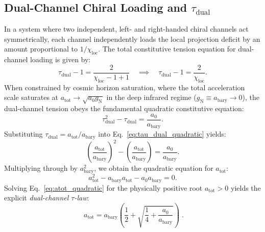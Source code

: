 \documentclass[11pt,a4paper]{article}
\theoremstyle{definition}
\begin{document}
\subsection{Dual-Channel Chiral Loading and $\tau_{\text{dual}}$}
In a system where two independent, left- and right-handed chiral channels act symmetrically, each channel independently loads the local projection deficit by an amount proportional to $1/\chi_{\text{loc}}$. The total constitutive tension equation for dual-channel loading is given by:
\begin{equation}
\tau_{\text{dual}} - 1 = \frac{2}{\chi_{\text{loc}} - 1 + 1} \quad \implies \quad \tau_{\text{dual}} - 1 = \frac{2}{\chi_{\text{loc}}}.
\end{equation}
When constrained by cosmic horizon saturation, where the total acceleration scale saturates at $a_{\text{tot}} \to \sqrt{a_0 g_{\text{N}}}$ in the deep infrared regime ($g_{\text{N}} \equiv a_{\text{bary}} \to 0$), the dual-channel tension obeys the fundamental quadratic constitutive equation:
\begin{equation}
\tau_{\text{dual}}^2 - \tau_{\text{dual}} = \frac{a_0}{a_{\text{bary}}}.
\label{eq:tau_dual_quadratic}
\end{equation}
Substituting $\tau_{\text{dual}} = a_{\text{tot}} / a_{\text{bary}}$ into Eq.~\eqref{eq:tau_dual_quadratic} yields:
\begin{equation}
\left( \frac{a_{\text{tot}}}{a_{\text{bary}}} \right)^2 - \left( \frac{a_{\text{tot}}}{a_{\text{bary}}} \right) = \frac{a_0}{a_{\text{bary}}}.
\end{equation}
Multiplying through by $a_{\text{bary}}^2$, we obtain the quadratic equation for $a_{\text{tot}}$:
\begin{equation}
a_{\text{tot}}^2 - a_{\text{bary}} a_{\text{tot}} - a_0 a_{\text{bary}} = 0.
\label{eq:atot_quadratic}
\end{equation}
Solving Eq.~\eqref{eq:atot_quadratic} for the physically positive root $a_{\text{tot}} > 0$ yields the explicit \emph{dual-channel $\tau$-law}:
\begin{equation}
\boxed{\;a_{\text{tot}} = a_{\text{bary}} \left( \frac{1}{2} + \sqrt{\frac{1}{4} + \frac{a_0}{a_{\text{bary}}}} \right)\;}.
\label{eq:tau_law_explicit}
\end{equation}
\end{document}
